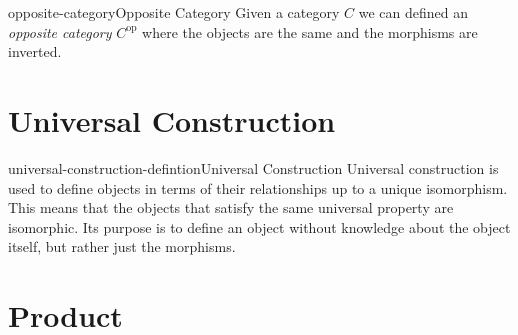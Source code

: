 \documentclass[preview]{standalone}
\newcommand{\opp}[1]{{#1}^{\text{op}}}
\begin{document}
\begin{snippetdefinition}{opposite-category}{Opposite Category}
    Given a category \(C\) we can defined an \textit{opposite category} \(\opp{C}\)
    where the objects are the same and the morphisms are inverted.
    
    \begin{center}
    \end{center}
\end{snippetdefinition}


\section{Universal Construction}

\begin{snippetdefinition}{universal-construction-defintion}{Universal Construction}
    Universal construction is used to define objects in terms of their
    relationships up to a unique isomorphism.
    This means that the objects that satisfy the same universal property
    are isomorphic.
    Its purpose is to define an object without knowledge about the object itself,
    but rather just the morphisms.
\end{snippetdefinition}

\section{Product}
\end{document}
